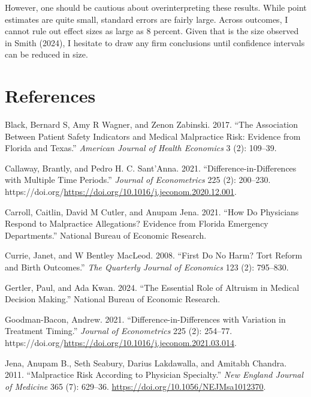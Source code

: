 \documentclass[
  12pt,
]{article}
\newlength{\cslhangindent}
\newlength{\cslentryspacingunit} %
\newenvironment{CSLReferences}[2] %
 {%
  \setlength{\parindent}{0pt}
  \ifodd #1
  \let\oldpar\par
  \def\par{\hangindent=\cslhangindent\oldpar}
  \fi
  \setlength{\parskip}{#2\cslentryspacingunit}
 }%
 {}
\begin{document}
However, one should be cautious about overinterpreting these results. While point estimates are quite small, standard errors are fairly large. Across outcomes, I cannot rule out effect sizes as large as 8 percent. Given that is the size observed in Smith (2024), I hesitate to draw any firm conclusions until confidence intervals can be reduced in size.

\hypertarget{references}{%
\section{References}\label{references}}

\hypertarget{refs}{}
\begin{CSLReferences}{1}{0}
\leavevmode{}%
Black, Bernard S, Amy R Wagner, and Zenon Zabinski. 2017. {``The Association Between Patient Safety Indicators and Medical Malpractice Risk: Evidence from Florida and Texas.''} \emph{American Journal of Health Economics} 3 (2): 109--39.

\leavevmode{}%
Callaway, Brantly, and Pedro H. C. Sant'Anna. 2021. {``Difference-in-Differences with Multiple Time Periods.''} \emph{Journal of Econometrics} 225 (2): 200--230. https://doi.org/\url{https://doi.org/10.1016/j.jeconom.2020.12.001}.

\leavevmode{}%
Carroll, Caitlin, David M Cutler, and Anupam Jena. 2021. {``How Do Physicians Respond to Malpractice Allegations? Evidence from Florida Emergency Departments.''} National Bureau of Economic Research.

\leavevmode{}%
Currie, Janet, and W Bentley MacLeod. 2008. {``First Do No Harm? Tort Reform and Birth Outcomes.''} \emph{The Quarterly Journal of Economics} 123 (2): 795--830.

\leavevmode{}%
Gertler, Paul, and Ada Kwan. 2024. {``The Essential Role of Altruism in Medical Decision Making.''} National Bureau of Economic Research.

\leavevmode{}%
Goodman-Bacon, Andrew. 2021. {``Difference-in-Differences with Variation in Treatment Timing.''} \emph{Journal of Econometrics} 225 (2): 254--77. https://doi.org/\url{https://doi.org/10.1016/j.jeconom.2021.03.014}.

\leavevmode{}%
Jena, Anupam B., Seth Seabury, Darius Lakdawalla, and Amitabh Chandra. 2011. {``Malpractice Risk According to Physician Specialty.''} \emph{New England Journal of Medicine} 365 (7): 629--36. \url{https://doi.org/10.1056/NEJMsa1012370}.


\end{CSLReferences}
\end{document}

